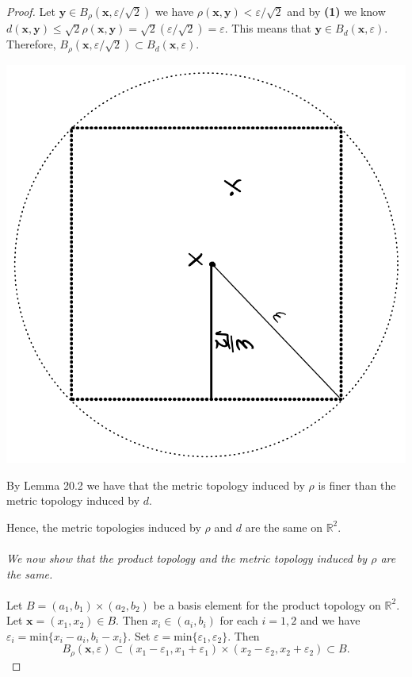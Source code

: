 \documentclass[12pt]{report}
\newcommand{\R}{\mathbb{R}^2}
\newcommand{\x}{\mathbf{x}}
\newcommand{\y}{\mathbf{y}}
\begin{document}
\begin{proof}
	Let $\y \in B_\rho(\x, \varepsilon/\sqrt{2})$ we have $\rho(\x,\y) < \varepsilon/\sqrt{2}$ and by \textbf{(1)} we know $d(\x,\y) \leq \sqrt{2}\rho(\x, \y) = \sqrt{2} (\varepsilon/\sqrt{2}) = \varepsilon$. This means that $\y \in B_d(\x, \varepsilon)$. Therefore, $B_\rho(\x, \varepsilon/\sqrt{2}) \subset B_d(\x, \varepsilon)$. 
\begin{center}
	\includegraphics[angle=90,scale=.4]{pic2.png}
\end{center}
\vspace{2in}
By Lemma 20.2 we have that the metric topology induced by $\rho $ is finer than the metric topology induced by $d$. 

Hence, the metric topologies induced by $\rho$ and $d$ are the same on $\R$.
\\\\
\emph{We now show that the product topology and the metric topology induced by $\rho$ are the same.}\\\\

Let $B = (a_1,b_1) \times (a_2,b_2)$ be a basis element for the product topology on $\R$. Let $\x = (x_1, x_2) \in B$. Then  $x_i \in (a_i, b_i)$ for each $i =1,2$ and we have $\varepsilon_i = \text{min}\{ x_i - a_i, b_i - x_i\}$. Set $\varepsilon = \text{min} \{ \varepsilon_1 , \varepsilon_2 \}$. Then 
\[ B_\rho (\x, \varepsilon) \subset (x_1-\varepsilon_1 , x_1+ \varepsilon_1) \times (x_2-\varepsilon_2 , x_2+ \varepsilon_2) \subset B. \]


\end{proof}
\end{document}
